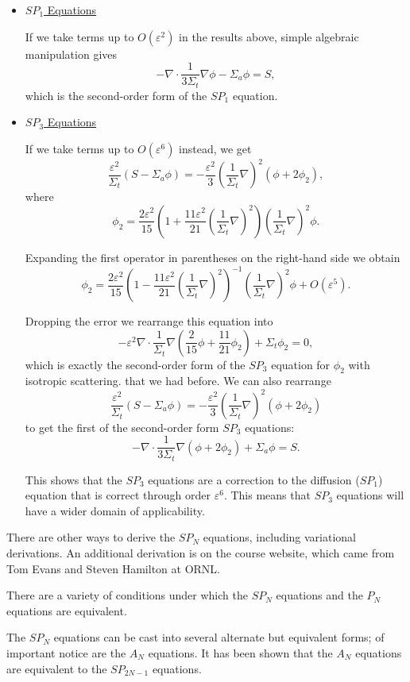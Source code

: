 \documentclass[12pt]{article}
\newcommand{\ep}{\ensuremath{\varepsilon}}
\begin{document}
\begin{itemize}

\item \underline{$SP_1$ Equations}

If we take terms up to $O(\ep^2)$ in the results above, simple algebraic manipulation gives
\[
-\nabla\cdot\frac{1}{3\Sigma_t}\nabla\phi-\Sigma_{a}\phi = S,
\]
which is the second-order form of the $SP_1$ equation.

\item \underline{$SP_3$ Equations}

If we take terms up to $O(\ep^6)$ instead, we get
\[
\frac{\ep^2}{\Sigma_t}(S-\Sigma_a\phi) = -\frac{\ep^2}{3}\left(\frac{1}{\Sigma_t}\nabla\right)^2(\phi+2\phi_2),
\]
where
\[
\phi_2= \frac{2\ep^2}{15}\left(1+\frac{11\ep^2}{21}\left(\frac{1}{\Sigma_t}\nabla\right)^2\right)\left(\frac{1}{\Sigma_t}\nabla\right)^2\phi.
\]

Expanding the first operator in parentheses on the right-hand side we obtain
\[
\phi_2= \frac{2\ep^2}{15}\left(1-\frac{11\ep^2}{21}\left(\frac{1}{\Sigma_t}\nabla\right)^2\right)^{-1}\left(\frac{1}{\Sigma_t}\nabla\right)^2\phi +O(\ep^5).
\]

Dropping the error we rearrange this equation into
\[
-\ep^2\nabla\cdot\frac{1}{\Sigma_t}\nabla\left(\frac{2}{15}\phi+\frac{11}{21}\phi_2\right)+\Sigma_t\phi_2=0,
\]
which is exactly the second-order form of the $SP_3$ equation for $\phi_2$ with isotropic scattering. that we had before. We can also rearrange
\[
\frac{\ep^2}{\Sigma_t}(S-\Sigma_a\phi) = -\frac{\ep^2}{3}\left(\frac{1}{\Sigma_t}\nabla\right)^2(\phi+2\phi_2)
\]
to get the first of the second-order form $SP_3$ equations:
\[
-\nabla\cdot\frac{1}{3\Sigma_t}\nabla(\phi+2\phi_2) + \Sigma_a\phi=S.
\]

This shows that the $SP_3$ equations are a
correction to the diffusion ($SP_1$) equation that is correct through
order $\ep^6$. This means that $SP_3$ equations will have a wider domain
of applicability.

\end{itemize}

There are other ways to derive the $SP_N$ equations, including variational derivations. An additional derivation is on the course website, which came from Tom Evans and Steven Hamilton at ORNL.

There are a variety of conditions under which the $SP_N$ equations and the $P_N$ equations are equivalent.

The $SP_N$ equations can be cast into several alternate but equivalent
forms; of important notice are the $A_N$ equations. It has been shown that the $A_N$ equations are equivalent to the $SP_{2N-1}$ equations.
\end{document}
